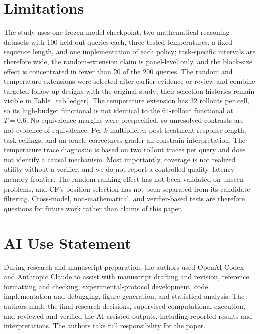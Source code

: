 \documentclass[11pt]{article}
\begin{document}
\section{Limitations}
\label{sec:limitations}

The study uses one frozen model checkpoint, two mathematical-reasoning datasets with 100 held-out queries each, three tested temperatures, a fixed sequence length, and one implementation of each policy; task-specific intervals are therefore wide, the random-extension claim is panel-level only, and the block-size effect is concentrated in fewer than 20 of the 200 queries. The random and temperature extensions were selected after earlier evidence or review and combine targeted follow-up designs with the original study; their selection histories remain visible in Table~\ref{tab:ledger}. The temperature extension has 32 rollouts per cell, so its high-budget functional is not identical to the 64-rollout functional at $T=0.6$. No equivalence margins were prespecified, so unresolved contrasts are not evidence of equivalence. Per-$k$ multiplicity, post-treatment response length, task ceilings, and an oracle correctness grader all constrain interpretation. The temperature trace diagnostic is based on two rollout traces per query and does not identify a causal mechanism. Most importantly, coverage is not realized utility without a verifier, and we do not report a controlled quality--latency--memory frontier. The random-ranking effect has not been validated on unseen problems, and CF's position selection has not been separated from its candidate filtering. Cross-model, non-mathematical, and verifier-based tests are therefore questions for future work rather than claims of this paper.

\section*{AI Use Statement}

During research and manuscript preparation, the authors used OpenAI Codex and Anthropic Claude to assist with manuscript drafting and revision, reference formatting and checking, experimental-protocol development, code implementation and debugging, figure generation, and statistical analysis. The authors made the final research decisions, supervised computational execution, and reviewed and verified the AI-assisted outputs, including reported results and interpretations. The authors take full responsibility for the paper.


\end{document}
